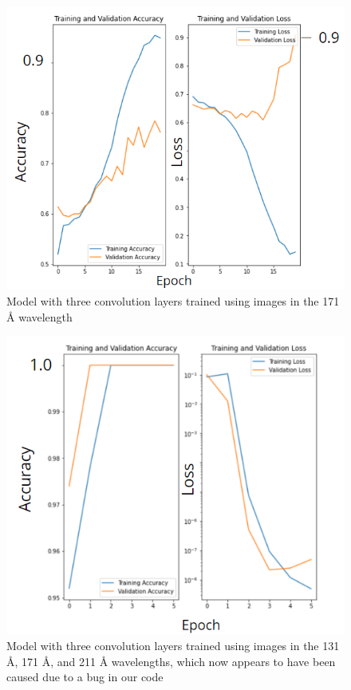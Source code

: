 \documentclass[12pt, letterpaper]{article}
\begin{document}
\begin{figure}[h]
	\includegraphics[width=\textwidth]{figures/171_threelayer.png}
	\centering
	\caption{Model with three convolution layers trained using images in the 171 Å wavelength}
	\label{CNN_171_3}
\end{figure}


\begin{figure}[h]
	\includegraphics[width=\textwidth]{figures/three_threelayer.png}
	\centering
	\caption{Model with three convolution layers trained using images in the 131 Å, 171 Å, and 211 Å wavelengths, which now appears to have been caused due to a bug in our code}
	\label{flare_bug}
\end{figure}
\end{document}
